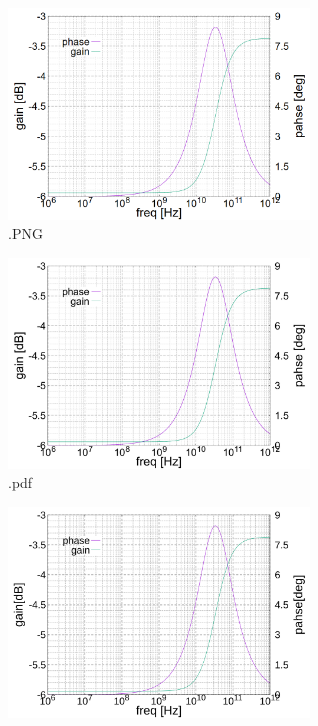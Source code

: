 \documentclass[twocolumn]{jsarticle}
\begin{document}
    \begin{figure}
        \begin{center}

            \includegraphics*[width=80mm]{figures/extention_test.PNG}
            \caption{.PNG}
        \end{center}
    \end{figure}
    \begin{figure}
        \begin{center}

            \includegraphics*[width=80mm]{figures/extention_test.pdf}
            \caption{.pdf}
        \end{center}
    \end{figure}
    \begin{figure}
        \begin{center}
            
            \includegraphics*[width=80mm]{figures/extention_test.svg}
        \end{center}
    \end{figure}
\end{document}
